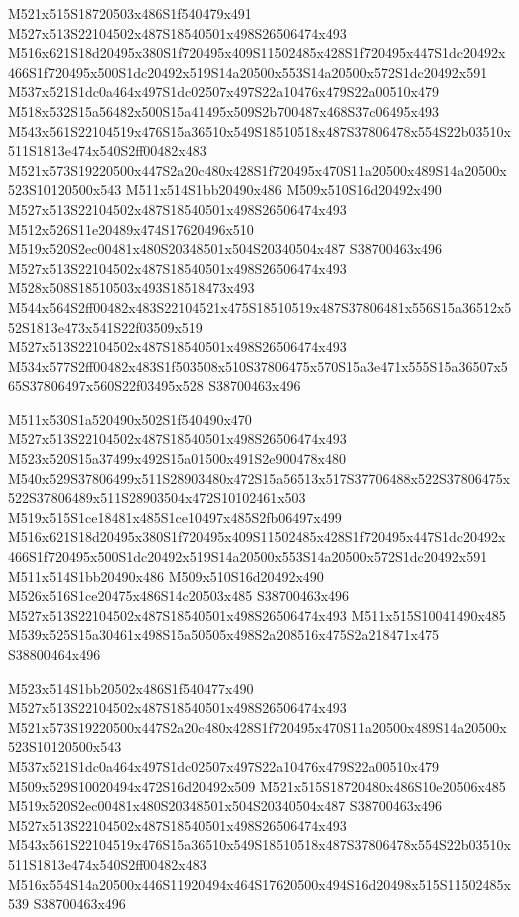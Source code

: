\documentclass{article}
\begin{document}
\begin{multicols}{2}
M521x515S18720503x486S1f540479x491 M527x513S22104502x487S18540501x498S26506474x493 M516x621S18d20495x380S1f720495x409S11502485x428S1f720495x447S1dc20492x466S1f720495x500S1dc20492x519S14a20500x553S14a20500x572S1dc20492x591 M537x521S1dc0a464x497S1dc02507x497S22a10476x479S22a00510x479 M518x532S15a56482x500S15a41495x509S2b700487x468S37c06495x493 M543x561S22104519x476S15a36510x549S18510518x487S37806478x554S22b03510x511S1813e474x540S2ff00482x483 M521x573S19220500x447S2a20c480x428S1f720495x470S11a20500x489S14a20500x523S10120500x543 M511x514S1bb20490x486 M509x510S16d20492x490 M527x513S22104502x487S18540501x498S26506474x493 M512x526S11e20489x474S17620496x510 M519x520S2ec00481x480S20348501x504S20340504x487 S38700463x496 M527x513S22104502x487S18540501x498S26506474x493 M528x508S18510503x493S18518473x493 M544x564S2ff00482x483S22104521x475S18510519x487S37806481x556S15a36512x552S1813e473x541S22f03509x519 M527x513S22104502x487S18540501x498S26506474x493 M534x577S2ff00482x483S1f503508x510S37806475x570S15a3e471x555S15a36507x565S37806497x560S22f03495x528 S38700463x496

M511x530S1a520490x502S1f540490x470 M527x513S22104502x487S18540501x498S26506474x493 M523x520S15a37499x492S15a01500x491S2e900478x480 M540x529S37806499x511S28903480x472S15a56513x517S37706488x522S37806475x522S37806489x511S28903504x472S10102461x503 M519x515S1ce18481x485S1ce10497x485S2fb06497x499 M516x621S18d20495x380S1f720495x409S11502485x428S1f720495x447S1dc20492x466S1f720495x500S1dc20492x519S14a20500x553S14a20500x572S1dc20492x591 M511x514S1bb20490x486 M509x510S16d20492x490 M526x516S1ce20475x486S14c20503x485 S38700463x496 M527x513S22104502x487S18540501x498S26506474x493 M511x515S10041490x485 M539x525S15a30461x498S15a50505x498S2a208516x475S2a218471x475 S38800464x496

M523x514S1bb20502x486S1f540477x490 M527x513S22104502x487S18540501x498S26506474x493 M521x573S19220500x447S2a20c480x428S1f720495x470S11a20500x489S14a20500x523S10120500x543 M537x521S1dc0a464x497S1dc02507x497S22a10476x479S22a00510x479 M509x529S10020494x472S16d20492x509 M521x515S18720480x486S10e20506x485 M519x520S2ec00481x480S20348501x504S20340504x487 S38700463x496 M527x513S22104502x487S18540501x498S26506474x493 M543x561S22104519x476S15a36510x549S18510518x487S37806478x554S22b03510x511S1813e474x540S2ff00482x483 M516x554S14a20500x446S11920494x464S17620500x494S16d20498x515S11502485x539 S38700463x496


\end{multicols}
\end{document}
